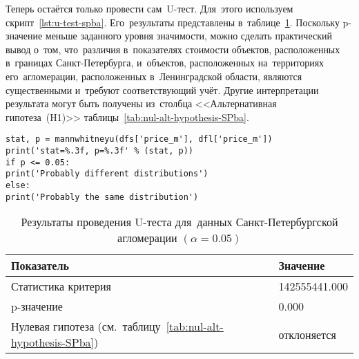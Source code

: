 \documentclass[]{scrreprt}
\begin{document}
Теперь остаётся только провести сам~U-тест. Для~этого используем скрипт~\ref{lst:u-test-spba}. Его~результаты представлены в~таблице~\ref{tab:u-test-py-result}. Поскольку p-значение меньше заданного уровня значимости, можно сделать практический вывод о~том, что~различия в~показателях стоимости объектов, расположенных в~границах Санкт-Петербурга, и~объектов, расположенных на~территориях его~агломерации, расположенных в~Ленинградской области, являются существенными и~требуют соответствующий учёт. Другие интерпретации результата могут быть получены из~столбца <<Альтернативная гипотеза~(H1)>> таблицы~\ref{tab:nul-alt-hypothesis-SPba}.
%
\begin{lstlisting}[float, caption = Проведение теста Манна"--~Уитни-Уилкоксона для~данных удельных цен предложения квартир в~агломерации Санкт-Петербурга, firstnumber=1, label= lst:u-test-spba]
stat, p = mannwhitneyu(dfs['price_m'], dfl['price_m'])
print('stat=%.3f, p=%.3f' % (stat, p))
if p <= 0.05:
print('Probably different distributions')
else:
print('Probably the same distribution')
\end{lstlisting}  
%
\begin{table}[ht]
	\caption{Результаты проведения U-теста для~данных Санкт-Петербургской агломерации $({\textstyle \alpha=0.05})$}\label{tab:u-test-py-result}
	\centering
	\begin{tabular}{ll}
		\hline
	Показатель&Значение\\
		\hline
	Статистика критерия&142555441.000\\
		\hline
	p-значение&0.000\\
		\hline
	Нулевая гипотеза (см.~таблицу~\ref{tab:nul-alt-hypothesis-SPba})&отклоняется\\
		\hline
	\end{tabular}
\end{table}

\clearpage
\end{document}
